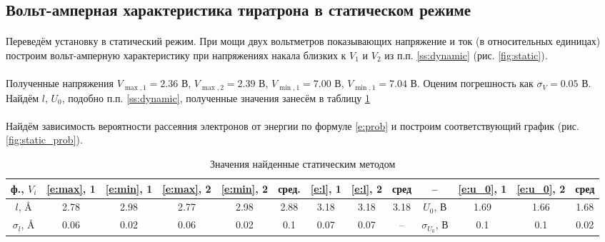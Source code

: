 \documentclass[a4paper,12pt]{article} %
\begin{document}
\subsection{Вольт-амперная характеристика тиратрона в статическом режиме}

\paragraph{} Переведём установку в статический режим. При мощи двух вольтметров показывающих напряжение и ток (в относительных единицах) построим вольт-амперную характеристику при напряжениях накала близких к $V_1$ и $V_2$ из п.п. \ref{ss:dynamic} (рис. \ref{fig:static}).

\paragraph{} Полученные напряжения $V_{\max, 1} = 2.36$ В, $V_{\max, 2} = 2.39$ В, $V_{\min, 1} = 7.00$ В, $V_{\min, 1} = 7.04$ В. Оценим погрешность как $\sigma_V = 0.05$ В. Найдём $l$, $U_0$, подобно п.п. \ref{ss:dynamic}, полученные значения занесём в таблицу \ref{tab:static_res}

\paragraph{} Найдём зависимость вероятности рассеяния электронов от энергии по формуле \eqref{e:prob} и построим соответствующий график (рис. \ref{fig:static_prob}).


\begin{table}[]
\scriptsize
\centering
\begin{tabular}{|c|c|c|c|c|c|c|c|c|c|c|c|c|}
\hline
ф., $V_i$     & \eqref{e:max}, 1 & \eqref{e:min}, 1 & \eqref{e:max}, 2 & \eqref{e:min}, 2 & сред. & \eqref{e:l}, 1 & \eqref{e:l}, 2 & сред & -- & \eqref{e:u_0}, 1 & \eqref{e:u_0}, 2 & сред \\ \hline
$l$, Å        & 2.78 & 2.98 & 2.77 & 2.98 & 2.88 & 3.18 & 3.18 & 3.18 & $U_0$, В          & 1.69 & 1.66 & 1.68 \\ \hline
$\sigma_l$, Å & 0.06 & 0.02 & 0.06 & 0.02 & 0.1  & 0.07 & 0.07 & --   & $\sigma_{U_0}$, В & 0.1  & 0.1  & 0.02 \\ \hline
\end{tabular}
\caption{Значения найденные статическим методом}
\label{tab:static_res}
\end{table}
\end{document}
